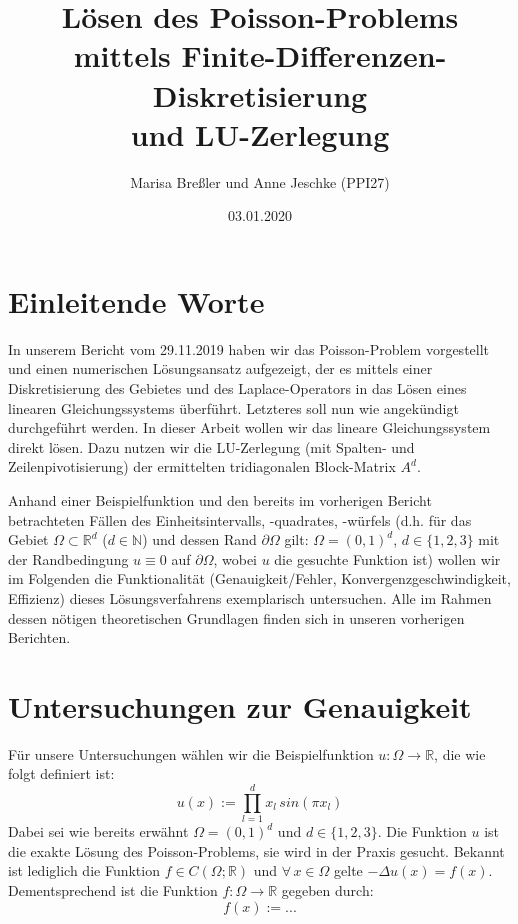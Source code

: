 \documentclass{scrartcl}
\newcommand{\R}{\mathbb{R}}
\begin{document}
\title{Lösen des Poisson-Problems mittels Finite-Differenzen-Diskretisierung\\
und LU-Zerlegung}
\author{Marisa Breßler und Anne Jeschke (PPI27)}
\date{03.01.2020}
\maketitle

\tableofcontents

\pagebreak
\section{Einleitende Worte}
In unserem Bericht  vom 29.11.2019 haben wir das Poisson-Problem vorgestellt und einen numerischen Lösungsansatz aufgezeigt, der es mittels einer Diskretisierung des Gebietes und des Laplace-Operators in das Lösen eines linearen Gleichungssystems überführt.
Letzteres soll nun wie angekündigt durchgeführt werden.
In dieser Arbeit wollen wir das lineare Gleichungssystem direkt lösen.
Dazu nutzen wir die LU-Zerlegung (mit Spalten- und Zeilenpivotisierung) der ermittelten tridiagonalen Block-Matrix $A^d$.

Anhand einer Beispielfunktion und den bereits im vorherigen Bericht betrachteten Fällen des Einheitsintervalls, -quadrates, -würfels (d.h. für das Gebiet $\Omega\subset\R^d$ ($d\in\mathbb{N}$) und dessen Rand $\partial\Omega$ gilt:
$\Omega=(0,1)^d$, $d\in\{1, 2, 3\}$ mit der Randbedingung $u \equiv 0$ auf $\partial\Omega$, wobei $u$ die gesuchte Funktion ist)
wollen wir im Folgenden die Funktionalität (Genauigkeit/Fehler, Konvergenzgeschwindigkeit, Effizienz) dieses Lösungsverfahrens exemplarisch untersuchen.
Alle im Rahmen dessen nötigen theoretischen Grundlagen finden sich in unseren vorherigen Berichten.

\pagebreak
\section{Untersuchungen zur Genauigkeit}
Für unsere Untersuchungen wählen wir die Beispielfunktion $u: \Omega \rightarrow \mathbb{R}$, die wie folgt definiert ist:
\[u(x) := \prod \limits_{l=1}^{d} x_l \, sin(\pi x_l)\]
Dabei sei wie bereits erwähnt $\Omega = (0,1)^d$ und $d\in\{1, 2, 3\}$.
Die Funktion $u$ ist die exakte Lösung des Poisson-Problems, sie wird in der Praxis gesucht. Bekannt ist lediglich die Funktion $f\in C(\Omega ; \R)$ und $\forall \, x \in\Omega$ gelte $-\Delta u(x) = f(x)$. Dementsprechend ist die Funktion $f: \Omega \rightarrow \mathbb{R}$ gegeben durch:
\[f(x) := ... \]
\end{document}
